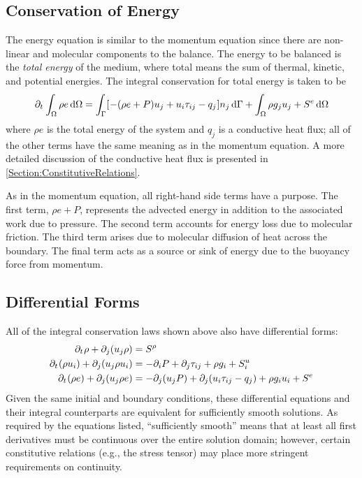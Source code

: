 \documentclass[12pt]{../UWMadThesis}
\begin{document}
\subsection{Conservation of Energy}
The energy equation is similar to the momentum equation since there are non-linear and molecular components to the balance.
The energy to be balanced is the \textit{total energy} of the medium, where total means the sum of thermal, kinetic, and potential energies.
The integral conservation for total energy is taken to be
\begin{equation}
    \pdt \IntV \rho e \dV = \IntS \left[- (\rho{e} + P) u_j + u_i \tau_{ij} - q_j\right] n_j\dS + \IntV \rho g_j u_j + S^e \dV
    \label{Eqn:IntegralCoE}
\end{equation}
where $\rho{e}$ is the total energy of the system and $q_j$ is a conductive heat flux; all of the other terms have the same meaning as in the momentum equation.
A more detailed discussion of the conductive heat flux is presented in \cref{Section:ConstitutiveRelations}.

As in the momentum equation, all right-hand side terms have a purpose.
The first term, $\rho{e} + P$, represents the advected energy in addition to the associated work due to pressure.
The second term accounts for energy loss due to molecular friction.
The third term arises due to molecular diffusion of heat across the boundary.
The final term acts as a source or sink of energy due to the buoyancy force from momentum.


\subsection{Differential Forms}
All of the integral conservation laws shown above also have differential forms:
\begin{align}
    \partial_t\:\! \rho + \partial_j(u_j \rho)           &= S^\rho \\
    \partial_t\:\! (\rho u_i) + \partial_j(u_j \rho u_i) &= -\partial_i{P} + \partial_j \tau_{ij} + \rho g_i + S^u_i \\
    \partial_t\:\! (\rho e) + \partial_j(u_j \rho{e})    &= -\partial_j(u_j P) + \partial_j(u_i \tau_{ij} - q_j) + \rho g_i u_i + S^e
\end{align}
Given the same initial and boundary conditions, these differential equations and their integral counterparts are equivalent for sufficiently smooth solutions.
As required by the equations listed, ``sufficiently smooth'' means that at least all first derivatives must be continuous over the entire solution domain; however, certain constitutive relations  (e.g., the stress tensor) may place more stringent requirements on continuity.
\end{document}
